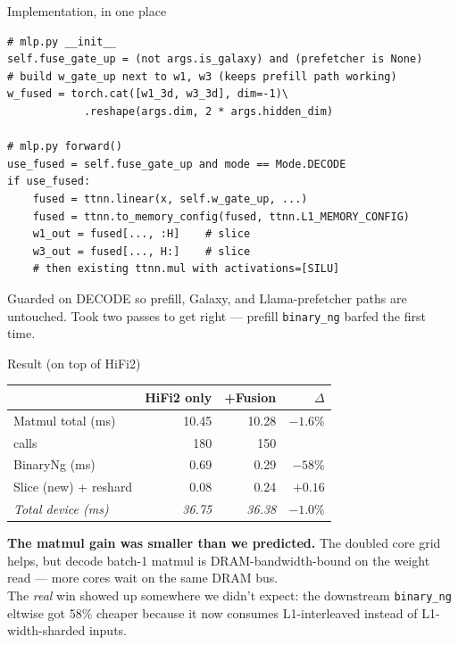 \documentclass[aspectratio=169,10pt]{beamer}
\begin{document}
\begin{frame}[fragile]{Implementation, in one place}
\begin{lstlisting}
# mlp.py __init__
self.fuse_gate_up = (not args.is_galaxy) and (prefetcher is None)
# build w_gate_up next to w1, w3 (keeps prefill path working)
w_fused = torch.cat([w1_3d, w3_3d], dim=-1)\
            .reshape(args.dim, 2 * args.hidden_dim)

# mlp.py forward()
use_fused = self.fuse_gate_up and mode == Mode.DECODE
if use_fused:
    fused = ttnn.linear(x, self.w_gate_up, ...)
    fused = ttnn.to_memory_config(fused, ttnn.L1_MEMORY_CONFIG)
    w1_out = fused[..., :H]    # slice
    w3_out = fused[..., H:]    # slice
    # then existing ttnn.mul with activations=[SILU]
\end{lstlisting}
  \vfill
  \small
  Guarded on DECODE so prefill, Galaxy, and Llama-prefetcher paths are
  untouched. Took two passes to get right --- prefill
  \texttt{binary\_ng} barfed the first time.
\end{frame}

\begin{frame}{Result (on top of HiFi2)}
  \centering
  \small
  \begin{tabular}{lrrr}
    \toprule
     & HiFi2 only & +Fusion & $\Delta$ \\
    \midrule
    Matmul total (ms)        & 10.45 & 10.28 & ${-}1.6\%$ \\
    \quad calls               &  180 &   150 &  \\
    BinaryNg (ms)            &  0.69 & \alert{0.29} & \alert{${-}58\%$} \\
    Slice (new) + reshard    &  0.08 &  0.24 & $+0.16$ \\
    \midrule
    \emph{Total device (ms)} & \emph{36.75} & \alert{\emph{36.38}} & \alert{${-}1.0\%$} \\
    \bottomrule
  \end{tabular}
  \vfill
  \textbf{The matmul gain was smaller than we predicted.} The doubled core
  grid helps, but decode batch-1 matmul is DRAM-bandwidth-bound on the
  weight read --- more cores wait on the same DRAM bus.\\[0.5em]
  The \emph{real} win showed up somewhere we didn't expect: the
  downstream \texttt{binary\_ng} eltwise got 58\% cheaper because it
  now consumes L1-interleaved instead of L1-width-sharded inputs.
\end{frame}

\end{document}
